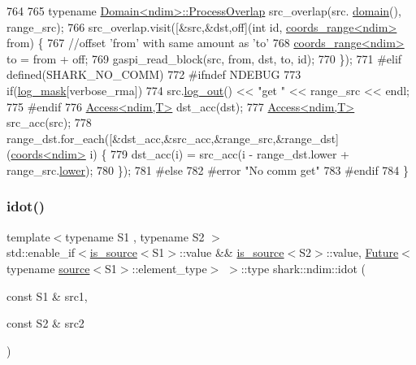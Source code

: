 \begin{DoxyCode}
764 
765     \textcolor{keyword}{typename} \hyperlink{classshark_1_1ndim_1_1_domain_1_1_process_overlap}{Domain<ndim>::ProcessOverlap} src\_overlap(src.
      \hyperlink{classshark_1_1ndim_1_1_global_array_a435ee8ff23c3feadf2ef2be64d4f375c}{domain}(), range\_src);
766     src\_overlap.visit([&src,&dst,off](\textcolor{keywordtype}{int} \textcolor{keywordtype}{id}, \hyperlink{structshark_1_1ndim_1_1coords__range}{coords\_range<ndim>} from) \{
767             \textcolor{comment}{//offset 'from' with same amount as 'to'}
768             \hyperlink{structshark_1_1ndim_1_1coords__range}{coords\_range<ndim>} to = from + off;
769             gaspi\_read\_block(src, from, dst, to, \textcolor{keywordtype}{id});
770             \});
771 \textcolor{preprocessor}{#elif defined(SHARK\_NO\_COMM)}
772 \textcolor{preprocessor}{#ifndef NDEBUG}
773     \textcolor{keywordflow}{if}(\hyperlink{namespaceshark_a110e03e8104b06caef346fcc25621aa9}{log\_mask}[verbose\_rma])
774         src.\hyperlink{classshark_1_1ndim_1_1_global_array_ae56b93f4ac19003102749015275a6d0c}{log\_out}() << \textcolor{stringliteral}{"get "} << range\_src << endl;
775 \textcolor{preprocessor}{#endif}
776     \hyperlink{classshark_1_1ndim_1_1_access}{Access<ndim,T>} dst\_acc(dst);
777     \hyperlink{classshark_1_1ndim_1_1_access}{Access<ndim,T>} src\_acc(src);
778     range\_dst.for\_each([&dst\_acc,&src\_acc,&range\_src,&range\_dst](\hyperlink{structshark_1_1ndim_1_1coords}{coords<ndim>} i) \{
779             dst\_acc(i) = src\_acc(i - range\_dst.lower + range\_src.\hyperlink{structshark_1_1ndim_1_1coords__range_a46cae2c424d7b20f911a970c92581b19}{lower});
780             \});
781 \textcolor{preprocessor}{#else}
782 \textcolor{preprocessor}{#error "No comm get"}
783 \textcolor{preprocessor}{#endif}
784 \}
\end{DoxyCode}
\hypertarget{namespaceshark_1_1ndim_ac03f6c0b503e2edea1872c3c62bc56cf}{}\label{namespaceshark_1_1ndim_ac03f6c0b503e2edea1872c3c62bc56cf} 
\subsubsection{\texorpdfstring{idot()}{idot()}}
{\footnotesize\ttfamily template$<$typename S1 , typename S2 $>$ \\
std\+::enable\+\_\+if$<$\hyperlink{classshark_1_1ndim_1_1is__source}{is\+\_\+source}$<$S1$>$\+::value \&\& \hyperlink{classshark_1_1ndim_1_1is__source}{is\+\_\+source}$<$S2$>$\+::value, \hyperlink{structshark_1_1_future}{Future}$<$typename \hyperlink{structshark_1_1ndim_1_1source}{source}$<$S1$>$\+::element\+\_\+type$>$ $>$\+::type shark\+::ndim\+::idot (\begin{DoxyParamCaption}\item[{const S1 \&}]{src1,  }\item[{const S2 \&}]{src2 }\end{DoxyParamCaption})}



